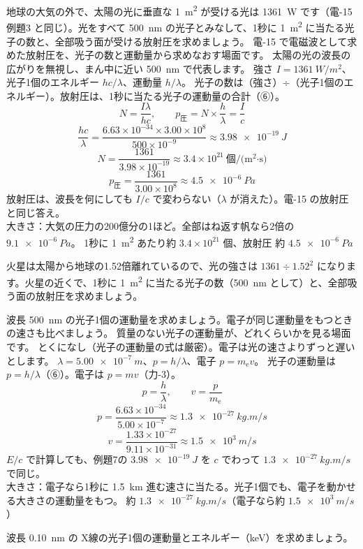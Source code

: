 \label{ph:原-2:ex7}
\begin{phreidai}[太陽の光の光子の数と放射圧]
地球の大気の外で、太陽の光に垂直な \qty{1}{m^2} が受ける光は \qty{1361}{W} です（電-15 例題3 と同じ）。光をすべて \qty{500}{nm} の光子とみなして、1秒に \qty{1}{m^2} に当たる光子の数と、全部吸う面が受ける放射圧を求めましょう。
\phbamen
電-15 で電磁波として求めた放射圧を、光子の数と運動量から求めなおす場面です。
\phmushi
太陽の光の波長の広がりを無視し、まん中に近い \qty{500}{nm} で代表します。
\phzu
強さ $I=\qty{1361}{W/m^2}$、光子1個のエネルギー $hc/\lambda$、運動量 $h/\lambda$。
\phriyu
光子の数は（強さ）÷（光子1個のエネルギー）。放射圧は、1秒に当たる光子の運動量の合計（⑥）。
\phtateru
\[ N=\frac{I\lambda}{hc},\qquad p_{\text{圧}}=N\times\frac{h}{\lambda}=\frac{I}{c} \]
\phtoku
\[ \frac{hc}{\lambda}=\frac{6.63\times10^{-34}\times3.00\times10^8}{500\times10^{-9}}\approx\qty{3.98e-19}{J} \]
\[ N=\frac{1361}{3.98\times10^{-19}}\approx3.4\times10^{21}\ \text{個/(m$^2$·s)} \]
\[ p_{\text{圧}}=\frac{1361}{3.00\times10^8}\approx\qty{4.5e-6}{Pa} \]
\phtashikame
放射圧は、波長を何にしても $I/c$ で変わらない（$\lambda$ が消えた）。電-15 の放射圧と同じ答え。\\
大きさ：大気の圧力の200億分の1ほど。全部はね返す帆なら2倍の $\qty{9.1e-6}{Pa}$。
\kotae 1秒に \qty{1}{m^2} あたり約 $3.4\times10^{21}$ 個、放射圧 約 $\qty{4.5e-6}{Pa}$
\end{phreidai}
\begin{jibun}
火星は太陽から地球の1.52倍離れているので、光の強さは $1361\div1.52^2$ になります。火星の近くで、1秒に \qty{1}{m^2} に当たる光子の数（\qty{500}{nm} として）と、全部吸う面の放射圧を求めましょう。
\end{jibun}

\label{ph:原-2:ex8}
\begin{phreidai}[光子1個の運動量]
波長 \qty{500}{nm} の光子1個の運動量を求めましょう。電子が同じ運動量をもつときの速さも比べましょう。
\phbamen
質量のない光子の運動量が、どれくらいかを見る場面です。
\phmushi
とくになし（光子の運動量の式は厳密）。電子は光の速さよりずっと遅いとします。
\phzu
$\lambda=\qty{5.00e-7}{m}$、$p=h/\lambda$、電子 $p=m_{\mathrm e}v$。
\phriyu
光子の運動量は $p=h/\lambda$（⑥）。電子は $p=mv$（力-3）。
\phtateru
\[ p=\frac{h}{\lambda},\qquad v=\frac{p}{m_{\mathrm e}} \]
\phtoku
\[ p=\frac{6.63\times10^{-34}}{5.00\times10^{-7}}\approx\qty{1.3e-27}{kg.m/s} \]
\[ v=\frac{1.33\times10^{-27}}{9.11\times10^{-31}}\approx\qty{1.5e3}{m/s} \]
\phtashikame
$E/c$ で計算しても、例題7の $\qty{3.98e-19}{J}$ を $c$ でわって $\qty{1.3e-27}{kg.m/s}$ で同じ。\\
大きさ：電子なら1秒に \qty{1.5}{km} 進む速さに当たる。光子1個でも、電子を動かせる大きさの運動量をもつ。
\kotae 約 $\qty{1.3e-27}{kg.m/s}$（電子なら約 $\qty{1.5e3}{m/s}$）
\end{phreidai}
\begin{jibun}
波長 \qty{0.10}{nm} の X線の光子1個の運動量とエネルギー（keV）を求めましょう。
\end{jibun}

